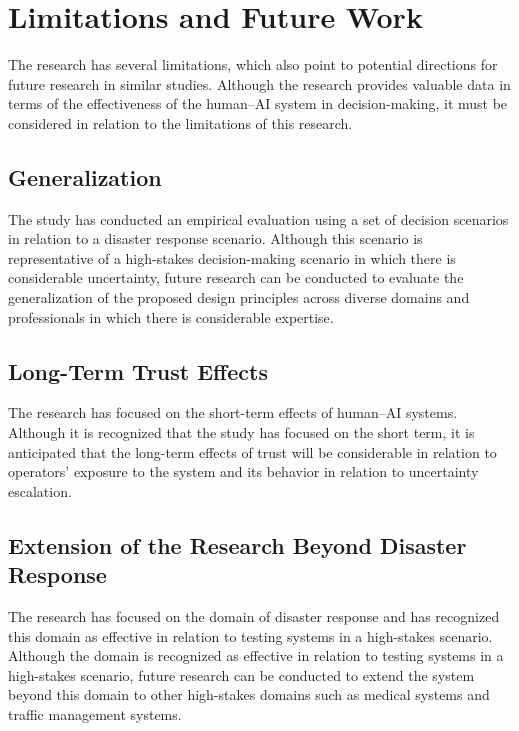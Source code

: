 \documentclass[journal]{IEEEtran}
\theoremstyle{plain}
\theoremstyle{definition}
\begin{document}
    \section{Limitations and Future Work}
    The research has several limitations, which also point to potential directions for future research in similar studies. Although the research provides valuable data in terms of the effectiveness of the human--AI system in decision-making, it must be considered in relation to the limitations of this research.

    \subsection{Generalization}
    The study has conducted an empirical evaluation using a set of decision scenarios in relation to a disaster response scenario. Although this scenario is representative of a high-stakes decision-making scenario in which there is considerable uncertainty, future research can be conducted to evaluate the generalization of the proposed design principles across diverse domains and professionals in which there is considerable expertise.

    \subsection{Long-Term Trust Effects}
    The research has focused on the short-term effects of human--AI systems. Although it is recognized that the study has focused on the short term, it is anticipated that the long-term effects of trust will be considerable in relation to operators' exposure to the system and its behavior in relation to uncertainty escalation.

    \subsection{Extension of the Research Beyond Disaster Response}
    The research has focused on the domain of disaster response and has recognized this domain as effective in relation to testing systems in a high-stakes scenario. Although the domain is recognized as effective in relation to testing systems in a high-stakes scenario, future research can be conducted to extend the system beyond this domain to other high-stakes domains such as medical systems and traffic management systems.

\end{document}
